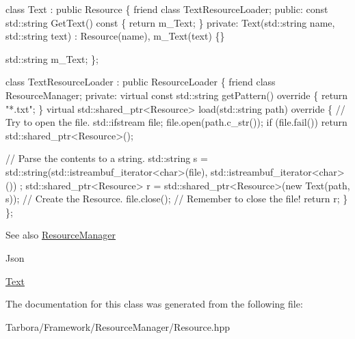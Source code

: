 \begin{DoxyCode}
\textcolor{keyword}{class }Text : \textcolor{keyword}{public} Resource
\{
    \textcolor{keyword}{friend} \textcolor{keyword}{class }TextResourceLoader;
\textcolor{keyword}{public}:
    \textcolor{keyword}{const} std::string GetText()\textcolor{keyword}{ const }\{ \textcolor{keywordflow}{return} m\_Text; \}
\textcolor{keyword}{private}:
    Text(std::string name, std::string text) : Resource(name), m\_Text(text) \{\}

    std::string m\_Text;
\};

\textcolor{keyword}{class }TextResourceLoader : \textcolor{keyword}{public} ResourceLoader
\{
    \textcolor{keyword}{friend} \textcolor{keyword}{class }ResourceManager;
\textcolor{keyword}{private}:
    \textcolor{keyword}{virtual} \textcolor{keyword}{const} std::string getPattern()\textcolor{keyword}{ override }\{ \textcolor{keywordflow}{return} \textcolor{stringliteral}{"*.txt"}; \}
    \textcolor{keyword}{virtual} std::shared\_ptr<Resource> load(std::string path)\textcolor{keyword}{ override}
\textcolor{keyword}{    }\{
        \textcolor{comment}{// Try to open the file.}
        std::ifstream file;
        file.open(path.c\_str());
        \textcolor{keywordflow}{if} (file.fail())
            \textcolor{keywordflow}{return} std::shared\_ptr<Resource>();

        \textcolor{comment}{// Parse the contents to a string.}
        std::string s = std::string(std::istreambuf\_iterator<char>(file), std::istreambuf\_iterator<char>())
      ;
        std::shared\_ptr<Resource> r = std::shared\_ptr<Resource>(\textcolor{keyword}{new} Text(path, s)); \textcolor{comment}{// Create the Resource.}
        file.close(); \textcolor{comment}{// Remember to close the file!}
        \textcolor{keywordflow}{return} r;
    \}
\};
\end{DoxyCode}


\begin{DoxySeeAlso}{See also}
\hyperlink{classTarbora_1_1ResourceManager}{Resource\+Manager} 

Json 

\hyperlink{classTarbora_1_1Text}{Text} 
\end{DoxySeeAlso}


The documentation for this class was generated from the following file\+:\begin{DoxyCompactItemize}
\item 
Tarbora/\+Framework/\+Resource\+Manager/Resource.\+hpp\end{DoxyCompactItemize}
